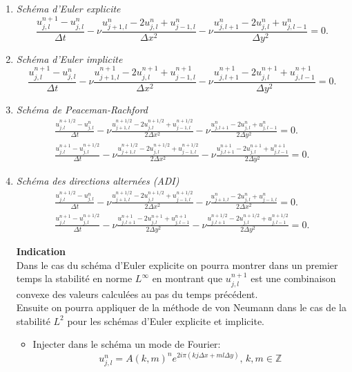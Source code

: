 \documentclass[12pt,a4paper]{article}
\begin{document}
\begin{enumerate}
\item {\it Sch\'ema d'Euler explicite}
$$
\frac{u_{j,l}^{n+1}-u_{j,l}^n}{\Delta t}-\nu \frac{u_{j+1,l}^{n}-2u_{j,l}^n+u_{j-1,l}^{n}}{\Delta x^2}-\nu \frac{u_{j,l+1}^{n}-2u_{j,l}^n+u_{j,l-1}^{n}}{\Delta y^2}=0.
$$

\item {\it Sch\'ema d'Euler implicite}
$$
\frac{u_{j,l}^{n+1}-u_{j,l}^n}{\Delta t}-\nu \frac{u_{j+1,l}^{n+1}-2u_{j,l}^{n+1}+u_{j-1,l}^{n+1}}{\Delta x^2}-\nu \frac{u_{j,l+1}^{n+1}-2u_{j,l}^{n+1}+u_{j,l-1}^{n+1}}{\Delta y^2}=0.
$$

\item {\it Sch\'ema de Peaceman-Rachford}
$$
\begin{array}{l}
\displaystyle \frac{u_{j,l}^{n+1/2}-u_{j,l}^n}{\Delta t}-\nu \frac{u_{j+1,l}^{n+1/2}-2u_{j,l}^{n+1/2}+u_{j-1,l}^{n+1/2}}{2\Delta x^2}-\nu \frac{u_{j,l+1}^{n}-2u_{j,l}^{n}+u_{j,l-1}^{n}}{2\Delta y^2}=0.\\

\displaystyle \frac{u_{j,l}^{n+1}-u_{j,l}^{n+1/2}}{\Delta t}-\nu \frac{u_{j+1,l}^{n+1/2}-2u_{j,l}^{n+1/2}+u_{j-1,l}^{n+1/2}}{2\Delta x^2}-\nu \frac{u_{j,l+1}^{n+1}-2u_{j,l}^{n+1}+u_{j,l-1}^{n+1}}{2\Delta y^2}=0.
\end{array}
$$

\item {\it Sch\'ema des directions alternées (ADI)}
$$
\begin{array}{l}
\displaystyle \frac{u_{j,l}^{n+1/2}-u_{j,l}^n}{\Delta t}-\nu \frac{u_{j+1,l}^{n+1/2}-2u_{j,l}^{n+1/2}+u_{j-1,l}^{n+1/2}}{2\Delta x^2}-\nu \frac{u_{j+1,l}^{n}-2u_{j,l}^{n}+u_{j-1,l}^{n}}{2\Delta x^2}=0.\\

\displaystyle \frac{u_{j,l}^{n+1}-u_{j,l}^{n+1/2}}{\Delta t}-\nu \frac{u_{j,l+1}^{n+1}-2u_{j,l}^{n+1}+u_{j,l-1}^{n+1}}{2\Delta y^2}-\nu \frac{u_{j,l+1}^{n+1/2}-2u_{j,l}^{n+1/2}+u_{j,l-1}^{n+1/2}}{2\Delta y^2}=0.
\end{array}
$$

\newpage
{\bf Indication}\\

Dans le cas du schéma d'Euler explicite on pourra montrer dans un premier temps la stabilité en norme $L^{\infty}$ en montrant que $u_{j,l}^{n+1}$ est une combinaison convexe des valeurs calculées au pas du temps précédent. \\

Ensuite on pourra appliquer  de la méthode de von Neumann dans le cas de la stabilité $L^2$ pour les schémas d'Euler explicite et implicite.
\begin{itemize}
\item Injecter dans le schéma un mode de Fourier:
$$
u^n_{j,l} = A(k,m)^n e^{2i\pi (kj\Delta x + ml\Delta y)},\, k,m\in \mathbb{Z}
$$


\end{itemize}
\end{enumerate}
\end{document}
